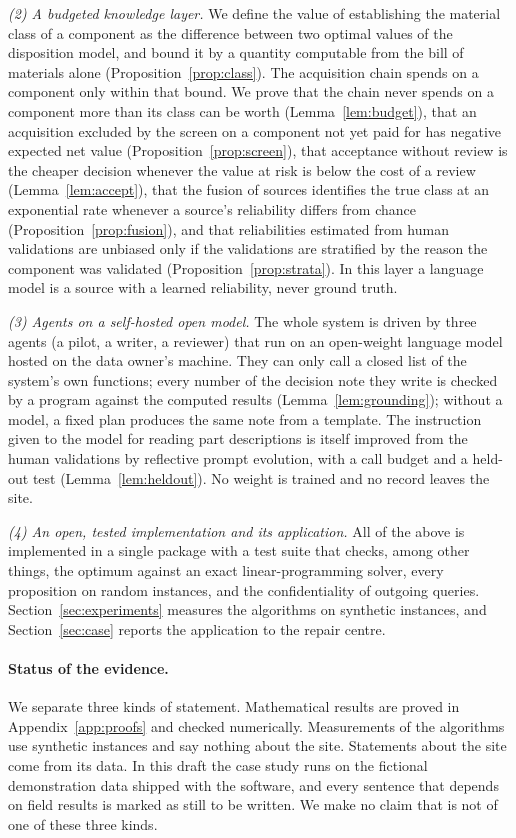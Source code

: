 \emph{(2) A budgeted knowledge layer.} We define the value of establishing the material class of a component as the
difference between two optimal values of the disposition model, and bound it by a quantity computable from the
bill of materials alone (Proposition~\ref{prop:class}). The acquisition chain spends on a component only within that
bound. We prove that the chain never spends on a component more than its class can be worth
(Lemma~\ref{lem:budget}), that an acquisition excluded by the screen on a component not yet paid for has negative
expected net value (Proposition~\ref{prop:screen}), that acceptance without review is the cheaper decision whenever the value at risk
is below the cost of a review (Lemma~\ref{lem:accept}), that the fusion of sources identifies the true class at an
exponential rate whenever a source's reliability differs from chance (Proposition~\ref{prop:fusion}), and that
reliabilities estimated from human validations are unbiased only if the validations are stratified by the reason the
component was validated (Proposition~\ref{prop:strata}). In this layer a language model is a source with a learned
reliability, never ground truth.

\emph{(3) Agents on a self-hosted open model.} The whole system is driven by three agents (a pilot, a writer, a
reviewer) that run on an open-weight language model hosted on the data owner's machine. They can only call a closed
list of the system's own functions; every number of the decision note they write is checked by a program against
the computed results (Lemma~\ref{lem:grounding}); without a model, a fixed plan produces the same note from a
template. The instruction given to the model for reading part descriptions is itself improved from the human
validations by reflective prompt evolution, with a call budget and a held-out test
(Lemma~\ref{lem:heldout}). No weight is trained and no record leaves the site.

\emph{(4) An open, tested implementation and its application.} All of the above is implemented in a single
package with a test suite that checks, among other things, the optimum against an exact linear-programming solver,
every proposition on random instances, and the confidentiality of outgoing queries.
Section~\ref{sec:experiments} measures the algorithms on synthetic instances, and Section~\ref{sec:case} reports
the application to the repair centre.

\paragraph{Status of the evidence.} We separate three kinds of statement. Mathematical results are proved in
Appendix~\ref{app:proofs} and checked numerically. Measurements of the algorithms use synthetic instances and say
nothing about the site. Statements about the site come from its data. \ifnum{}\relax In this draft the
case study runs on the fictional demonstration data shipped with the software, and every sentence that depends on
field results is marked as still to be written.\fi{} We make no claim that is not of one of these three kinds.

